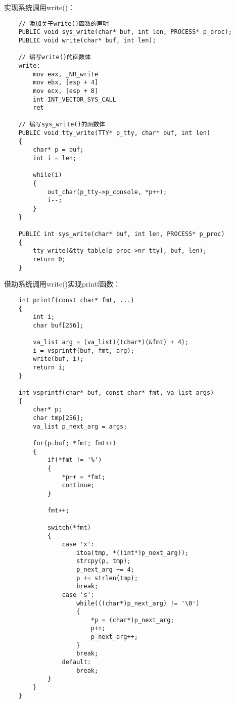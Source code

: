 \documentclass[a4paper,left=2.5cm,right=2.5cm,11pt]{article}
\begin{document}
	实现系统调用write()：
	\begin{lstlisting}
	// 添加关于write()函数的声明
	PUBLIC void sys_write(char* buf, int len, PROCESS* p_proc);
	PUBLIC void write(char* buf, int len);

	// 编写write()的函数体
	write:
		mov eax, _NR_write
		mov ebx, [esp + 4]
		mov ecx, [esp + 8]
		int INT_VECTOR_SYS_CALL
		ret

	// 编写sys_write()的函数体
	PUBLIC void tty_write(TTY* p_tty, char* buf, int len)
	{
		char* p = buf;
		int i = len;

		while(i)
		{
			out_char(p_tty->p_console, *p++);
			i--;
		}
	}

	PUBLIC int sys_write(char* buf, int len, PROCESS* p_proc)
	{
		tty_write(&tty_table[p_proc->nr_tty], buf, len);
		return 0;
	}
	\end{lstlisting}

	借助系统调用write()实现printf函数：
	\begin{lstlisting}
	int printf(const char* fmt, ...)
	{
		int i;
		char buf[256];

		va_list arg = (va_list)((char*)(&fmt) + 4);
		i = vsprintf(buf, fmt, arg);
		write(buf, i);
		return i;
	}

	int vsprintf(char* buf, const char* fmt, va_list args)
	{
		char* p;
		char tmp[256];
		va_list p_next_arg = args;

		for(p=buf; *fmt; fmt++)
		{
			if(*fmt != '%')
			{
				*p++ = *fmt;
				continue;
			}

			fmt++;

			switch(*fmt)
			{
				case 'x':
					itoa(tmp, *((int*)p_next_arg));
					strcpy(p, tmp);
					p_next_arg += 4;
					p += strlen(tmp);
					break;
				case 's':
					while(((char*)p_next_arg) != '\0')
					{
						*p = (char*)p_next_arg;
						p++;
						p_next_arg++;
					}
					break;
				default:
					break;
			}
		}
	}
	\end{lstlisting}
\end{document}
